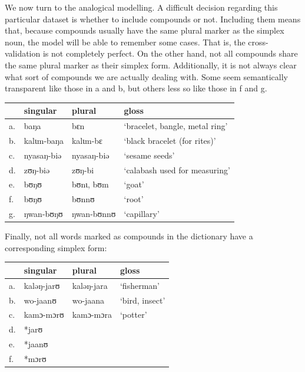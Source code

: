 We now turn to the analogical modelling. A difficult decision regarding this particular dataset is whether to include compounds or not. Including them means that, because compounds usually have the same plural marker as the simplex noun, the model will be able to remember some cases. That is, the cross-validation is not completely perfect. On the other hand, not all compounds share the same plural marker as their simplex form. Additionally, it is not always clear what sort of compounds we are actually dealing with. Some seem semantically transparent like those in a and b, but others less so like those in f and g.

\begin{exe}
    \ex \label{different-pl-kasem}
    \begin{tabular}[t]{llll}
      & singular                         & plural     & gloss                          \\
      \midrule
      a. & \label{comp-kas-sem1} baŋa       & bɛn        & `bracelet, bangle, metal ring' \\
      b. & \label{comp-kas-sem2} kalɩm-baŋa & kalɩm-bɛ   & `black bracelet (for rites)'   \\
      c. & nyasaŋ-biə                       & nyasaŋ-biə & `sesame seeds'                 \\
      d. & zʊŋ-biə                          & zʊŋ-bi     & `calabash used for measuring'  \\
      e. & bʊŋʊ                             & bʊnɩ, bʊm  & `goat'                         \\
      f. & \label{comp-kas-sem3} bʊŋʊ       & bʊnnʊ      & `root'                         \\
      g. & \label{comp-kas-sem4} ŋwan-bʊŋʊ  & ŋwan-bʊnnʊ & `capillary'                    \\
    \end{tabular}
\end{exe}

Finally, not all words marked as compounds in the dictionary have a corresponding simplex form:

\begin{exe}
    \ex \label{no-simplex-kasem}
    \begin{tabular}[t]{llll}
      & singular   & plural     & gloss          \\
      \midrule
      a. & kaləŋ-jarʊ & kaləŋ-jara & `fisherman'    \\
      b. & wo-jaanʊ   & wo-jaana   & `bird, insect' \\
      c. & kamɔ-mɔrʊ  & kamɔ-mɔra  & `potter'       \\
      d. & *jarʊ                                    \\
      e. & *jaanʊ                                   \\
      f. & *mɔrʊ                                    \\
    \end{tabular}
\end{exe}

